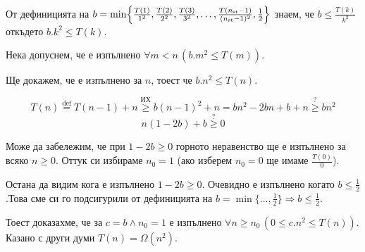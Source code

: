 \begin{solution}
\begin{itemize}
\begin{base}
			От дефиницията на $b=\min\Bigl\{\frac{T(1)}{1^2},\frac{T(2)}{2^2},\frac{T(3)}{3^2},\dots,\frac{T(n_{\text{st}}-1)}{({n_{\text{st}}-1)^2}},\frac12\Bigr\}$ знаем, че $b\le \frac{T(k)}{k^2}$ откъдето $b.k^2\le T(k)$.
		\end{base}
		
		\begin{indhypothesis}
			Нека допуснем, че е изпълнено $\forall m<n\,(b.m^2\le T(m))$.
		\end{indhypothesis}
	
	\begin{indstep}
		Ще докажем, че е изпълнено за $n$, тоест че $b.n^2\le T(n)$.
		
		\begin{equation*}
			T(n)\overset{\text{def}}{=}T(n-1)+n\overset{\text{ИХ}}{\ge}b(n-1)^2+n=bn^2-2bn+b+n\overset{?}{\ge}bn^2
		\end{equation*}
		\begin{equation*}
			n(1-2b)+b\overset{?}{\ge}0
		\end{equation*}
	
		Може да забележим, че при $1-2b\ge0$ горното неравенство ще е изпълнено за всяко $n\ge0$. Оттук си избираме $n_0=1$ (ако изберем $n_0=0$ ще имаме $\frac{T(0)}{0}$).
		
		Остана да видим кога е изпълнено $1-2b\ge0$. Очевидно е изпълнено когато $b\le\frac12$.\qquad Това сме си го подсигурили от дефиницията на $b=\min\{\dots,\frac12\}\Rightarrow b\le\frac12$.
	\end{indstep}

	Тоест доказахме, че за $c=b\land n_0=1$ е изпълнено $\forall n\ge n_0\,(0\le c.n^2\le T(n))$. Казано с други думи $T(n)=\Omega(n^2)$.
		
	\end{itemize}
\end{solution}

\newpage

